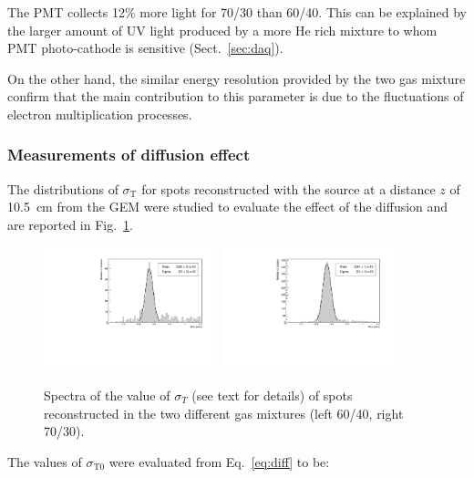 \documentclass[a4paper,11pt]{article}
\begin{document}
The PMT collects 12\% more light for 70/30 than 60/40. This can be explained by the larger amount of UV light produced by a more He rich mixture to whom PMT photo-cathode is sensitive (Sect.~\ref{sec:daq}).

On the other hand, the similar energy resolution provided by the two gas mixture confirm that the main contribution to this parameter is due to the fluctuations of electron multiplication processes.


\subsubsection{Measurements of diffusion effect}

The distributions of $\sigma_{\mathrm{T}}$ for spots reconstructed with the source at a distance $z$ of 10.5~cm from the GEM were studied to evaluate the effect of the diffusion and are reported in Fig.~\ref{fig:sizeZ}.

\begin{figure}[ht]
\centering
\includegraphics[width=0.45\textwidth]{Figures/Draft2_DB_Size_6040.pdf}
\includegraphics[width=0.45\textwidth]{Figures/Draft2_DB_Size_7030.pdf}
\caption{Spectra of the value of $\sigma_T$ (see text for details) of spots reconstructed in the two different gas mixtures (left 60/40, right 70/30).}
\label{fig:sizeZ}
\end{figure}

The values of $\sigma_{\mathrm{T0}}$ were evaluated from Eq.~\ref{eq:diff} to be:
\end{document}
